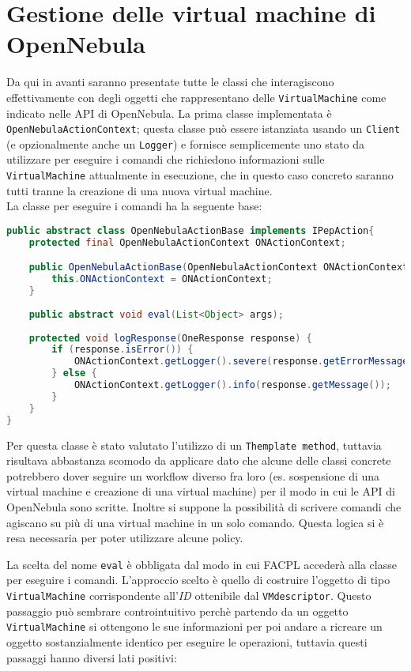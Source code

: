 \section{Gestione delle virtual machine di OpenNebula}
Da qui in avanti saranno presentate tutte le classi che interagiscono effettivamente con degli oggetti che rappresentano delle \texttt{VirtualMachine} come indicato nelle API di OpenNebula.
La prima classe implementata è \texttt{OpenNebulaActionContext}; questa classe può essere istanziata usando un \texttt{Client} (e opzionalmente anche un \texttt{Logger}) e fornisce semplicemente uno stato da utilizzare per eseguire i comandi che richiedono informazioni sulle \texttt{VirtualMachine} attualmente in esecuzione, che in questo caso concreto saranno tutti tranne la creazione di una nuova virtual machine.\\
La classe per eseguire i comandi ha la seguente base:
\begin{lstlisting}[language=Java, caption=Classe astratta per i comandi, label=code:OpenNebulaActionBase]
public abstract class OpenNebulaActionBase implements IPepAction{
    protected final OpenNebulaActionContext ONActionContext;

    public OpenNebulaActionBase(OpenNebulaActionContext ONActionContext) {
        this.ONActionContext = ONActionContext;
    }
    
    public abstract void eval(List<Object> args);
    
    protected void logResponse(OneResponse response) {
        if (response.isError()) {
            ONActionContext.getLogger().severe(response.getErrorMessage());
        } else {
            ONActionContext.getLogger().info(response.getMessage());
        }
    }
}
\end{lstlisting}
Per questa classe è stato valutato l'utilizzo di un \texttt{Themplate method}, tuttavia risultava abbastanza scomodo da applicare dato che alcune delle classi concrete potrebbero dover seguire un workflow diverso fra loro (es. sospensione di una virtual machine e creazione di una virtual machine) per il modo in cui le API di OpenNebula sono scritte. Inoltre si suppone la possibilità di scrivere comandi che agiscano su più di una virtual machine in un solo comando. Questa logica si è resa necessaria per poter utilizzare alcune policy.\par
La scelta del nome \texttt{eval} è obbligata dal modo in cui FACPL accederà alla classe per eseguire i comandi.
L'approccio scelto è quello di costruire l'oggetto di tipo \texttt{VirtualMachine} corrispondente all'\emph{ID} ottenibile dal \texttt{VMdescriptor}. Questo passaggio può sembrare controintuitivo perchè partendo da un oggetto \texttt{VirtualMachine} si ottengono le sue informazioni per poi andare a ricreare un oggetto sostanzialmente identico per eseguire le operazioni, tuttavia questi passaggi hanno diversi lati positivi:
